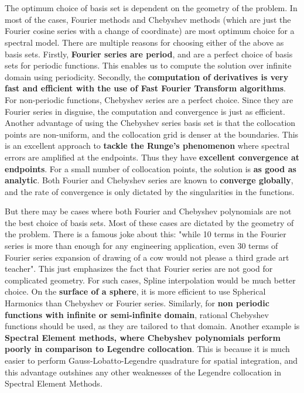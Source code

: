 \documentclass{article}
\begin{document}
\section{}
The optimum choice of basis set is dependent on the geometry of the problem. In most of the cases, Fourier methods and Chebyshev methods (which are just the Fourier cosine series with a change of coordinate) are most optimum choice for a spectral model. There are multiple reasons for choosing either of the above as basis sets. Firstly, \textbf{Fourier series are period}, and are a perfect choice of basis sets for periodic functions. This enables us to compute the solution over infinite domain using periodicity. Secondly, the \textbf{computation of derivatives is very fast and efficient with the use of Fast Fourier Transform algorithms}. For non-periodic functions, Chebyshev series are a perfect choice. Since they are Fourier series in disguise, the computation and convergence is just as efficient. Another advantage of using the Chebyshev series basis set is that the collocation points are non-uniform, and the collocation grid is denser at the boundaries. This is an excellent approach to \textbf{tackle the Runge's phenomenon} where spectral errors are amplified at the endpoints. Thus they have \textbf{excellent convergence at endpoints}. For a small number of collocation points, the solution is \textbf{as good as analytic}. Both Fourier and Chebyshev series are known to \textbf{converge globally}, and the rate of convergence is only dictated by the singularities in the functions.


But there may be cases where both Fourier and Chebyshev polynomials are not the best choice of basis sets. Most of these cases are dictated by the geometry of the problem. There is a famous joke about this: "while 10 terms in the Fourier series is more than enough for any engineering application, even 30 terms of Fourier series expansion of drawing of a cow would not please a third grade art teacher". This just emphasizes the fact that Fourier series are not good for complicated geometry. For such cases, Spline interpolation would be much better choice. On the \textbf{surface of a sphere}, it is more efficient to use Spherical Harmonics than Chebyshev or Fourier series. Similarly, for \textbf{non periodic functions with infinite or semi-infinite domain}, rational Chebyshev functions should be used, as they are tailored to that domain. Another example is \textbf{Spectral Element methods, where Chebyshev polynomials perform poorly in comparison to Legendre collocation}. This is because it is much easier to perform Gauss-Lobatto-Legendre quadrature for spatial integration, and this advantage outshines any other weaknesses of the Legendre collocation in Spectral Element Methods.
\end{document}
